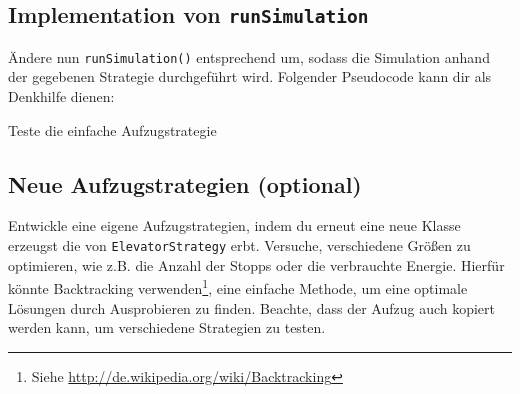 \subsection{Implementation von \texttt{runSimulation}}
Ändere nun \texttt{runSimulation()} entsprechend um, sodass die Simulation anhand der gegebenen Strategie durchgeführt wird.
Folgender Pseudocode kann dir als Denkhilfe dienen:

\begin{algorithm}[H]
 \SetAlgoLined
\end{algorithm}

Teste die einfache Aufzugstrategie

\subsection{Neue Aufzugstrategien (optional)}
Entwickle eine eigene Aufzugstrategien, indem du erneut eine neue Klasse erzeugst die von \texttt{ElevatorStrategy} erbt.
Versuche, verschiedene Größen zu optimieren, wie z.B. die Anzahl der Stopps oder die verbrauchte Energie.
Hierfür könnte Backtracking verwenden\footnote{Siehe \url{http://de.wikipedia.org/wiki/Backtracking}}, eine einfache Methode, um eine optimale Lösungen durch Ausprobieren zu finden. Beachte, dass der Aufzug auch kopiert werden kann, um verschiedene Strategien zu testen.



